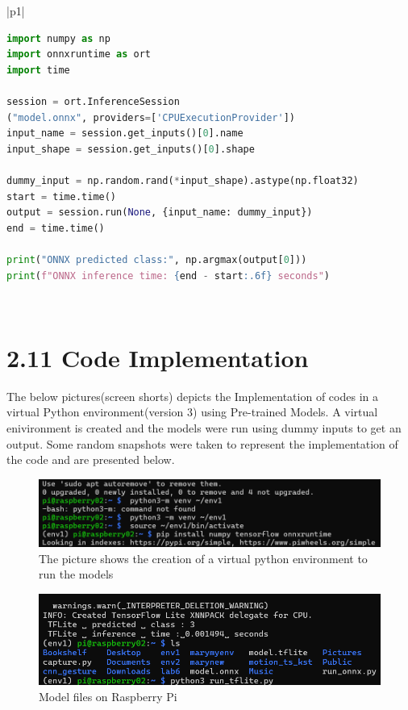 \documentclass[12pt]{article}
\begin{document}
\begin{table}[H]
\centering
\begin{tabular}{|p{1\textwidth}|}
\hline
\begin{minipage}{\linewidth}
\begin{lstlisting}[language=Python]
import numpy as np
import onnxruntime as ort
import time

session = ort.InferenceSession
("model.onnx", providers=['CPUExecutionProvider'])
input_name = session.get_inputs()[0].name
input_shape = session.get_inputs()[0].shape

dummy_input = np.random.rand(*input_shape).astype(np.float32)
start = time.time()
output = session.run(None, {input_name: dummy_input})
end = time.time()

print("ONNX predicted class:", np.argmax(output[0]))
print(f"ONNX inference time: {end - start:.6f} seconds")
\end{lstlisting}
\end{minipage}
\\ \hline
\end{tabular}
\caption{ONNX inference script inside a table}
\end{table}


\section*{2.11 Code Implementation}
The below pictures(screen shorts) depicts the Implementation of codes in a virtual Python environment(version 3) using Pre-trained Models. A virtual enivironment is created and the models were run using dummy inputs to get an output. Some random snapshots were taken to represent the implementation of the code and are presented below.


\begin{figure}[H]
\centering
\includegraphics[width=1\textwidth]{screenshot1.png}
\caption{The picture shows the creation of  a virtual python environment to run the models  }
\end{figure}

\begin{figure}[H]
\centering
\includegraphics[width=1\textwidth]{screenshot2.png}
\caption{Model files on Raspberry Pi}
\end{figure}
\end{document}
